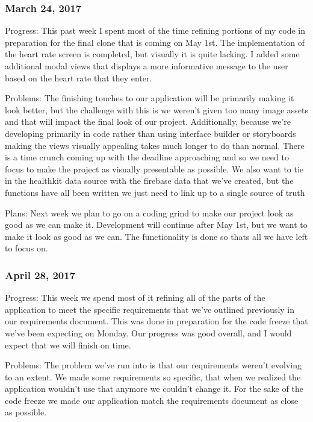 \subsubsection{March 24, 2017}\label{section}
Progress: This past week I spent most of the time refining portions of
my code in preparation for the final clone that is coming on May 1st.
The implementation of the heart rate screen is completed, but visually
it is quite lacking. I added some additional modal views that displays a
more informative message to the user based on the heart rate that they
enter.

Problems: The finishing touches to our application will be primarily
making it look better, but the challenge with this is we weren't given
too many image assets and that will impact the final look of our
project. Additionally, because we're developing primarily in code rather
than using interface builder or storyboards making the views visually
appealing takes much longer to do than normal. There is a time crunch
coming up with the deadline approaching and so we need to focus to make
the project as visually presentable as possible. We also want to tie in
the healthkit data source with the firebase data that we've created, but
the functions have all been written we just need to link up to a single
source of truth

Plans: Next week we plan to go on a coding grind to make our project
look as good as we can make it. Development will continue after May 1st,
but we want to make it look as good as we can. The functionality is done
so thats all we have left to focus on.

\subsubsection{April 28, 2017}\label{section}
Progress: This week we spend most of it refining all of the parts of the
application to meet the specific requirements that we've outlined
previously in our requirements document. This was done in preparation
for the code freeze that we've been expecting on Monday. Our progress
was good overall, and I would expect that we will finish on time.

Problems: The problem we've run into is that our requirements weren't
evolving to an extent. We made some requirements so specific, that when
we realized the application wouldn't use that anymore we couldn't change
it. For the sake of the code freeze we made our application match the
requirements document as close as possible.

